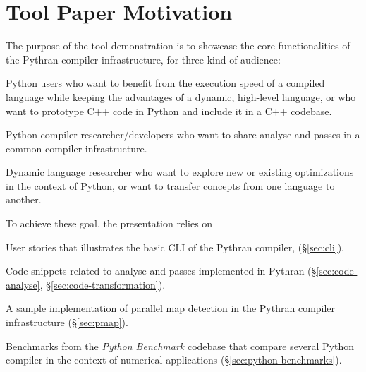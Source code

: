 \documentclass{llncs}
\begin{document}
\setcounter{page}{6}



%
%
%

\section{Tool Paper Motivation}

The purpose of the tool demonstration is to showcase the core functionalities
of the Pythran compiler infrastructure, for three kind of audience:
\begin{inparaenum} \item Python users who want to benefit from the execution
        speed of a compiled language while keeping the advantages of a dynamic,
        high-level language, or who want to prototype C++ code in Python and
        include it in a C++ codebase.  \item Python compiler
        researcher/developers who want to share analyse and passes in a common
    compiler infrastructure.  \item Dynamic language researcher who want to
        explore new or existing optimizations in the context of Python, or want
        to transfer concepts from one language to another.  \end{inparaenum}

To achieve these goal, the presentation relies on \begin{inparaenum} \item User
    stories that illustrates the basic \ac{CLI} of the Pythran compiler,
(\S\ref{sec:cli}).  \item Code snippets related to analyse and passes
    implemented in Pythran (\S\ref{sec:code-analyse},
\S\ref{sec:code-transformation}). \item A sample implementation of parallel map
detection in the Pythran compiler infrastructure (\S\ref{sec:pmap}).  \item
Benchmarks from the \emph{Python Benchmark} codebase that compare several
Python compiler in the context of numerical applications
(\S\ref{sec:python-benchmarks}). \end{inparaenum}
\end{document}
